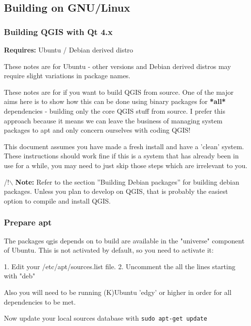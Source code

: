 \hypertarget{toc3}{}
\subsection{Building on GNU/Linux}
\hypertarget{toc4}{}
\subsubsection{Building QGIS with Qt 4.x}
\textbf{Requires:} Ubuntu / Debian derived distro

These notes are for Ubuntu - other versions and Debian derived distros may
require slight variations in package names.

These notes are for if you want to build QGIS from source. One of the major
aims here is to show how this can be done using binary packages for \textbf{*all*}
dependencies - building only the core QGIS stuff from source. I prefer this
approach because it means we can leave the business of managing system packages
to apt and only concern ourselves with coding QGIS! 

This document assumes you have made a fresh install and have a 'clean' system.
These instructions should work fine if this is a system that has already been
in use for a while, you may need to just skip those steps which are irrelevant
to you.

/!$\backslash$ \textbf{Note:} Refer to the section ''Building Debian packages'' for building 
debian packages.  Unless you plan to develop on QGIS, that is probably the
easiest option to compile and install QGIS.

\hypertarget{toc5}{}
\subsubsection{Prepare apt}
The packages qgis depends on to build are available in the "universe" component
of Ubuntu. This is not activated by default, so you need to activate it:

1. Edit your /etc/apt/sources.list file.  
2. Uncomment the all the lines starting with "deb"

Also you will need to be running (K)Ubuntu 'edgy' or higher in order for 
all dependencies to be met.

Now update your local sources database with \texttt{sudo apt-get update} 

\hypertarget{toc6}{}

